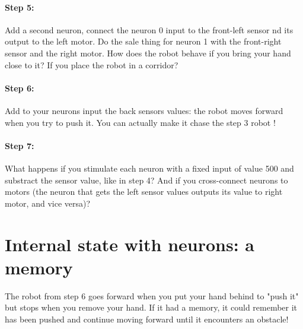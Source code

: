 \documentclass[12pt]{article}
\begin{document}
\paragraph{Step 5:} Add a second neuron, connect the neuron 0 input to the front-left sensor nd its output to the left motor. Do the sale thing for neuron 1 with the front-right sensor and the right motor. How does the robot behave if you bring your hand close to it? If you place the robot in a corridor?

\paragraph{Step 6:} Add to your neurons input the back sensors values: the robot moves forward when you try to push it. You can actually make it chase the step 3 robot !

\paragraph{Step 7:} What happens if you stimulate each neuron with a fixed input of value 500 and substract the sensor value, like in step 4? And if you cross-connect neurons to motors (the neuron that gets the left sensor values outputs its value to right motor, and vice versa)?

\section{Internal state with neurons: a memory}

The robot from step 6 goes forward when you put your hand behind to "push it" but stops when you remove your hand. If it had a memory, it could remember it has been pushed and continue moving forward until it encounters an obstacle!
\end{document}
